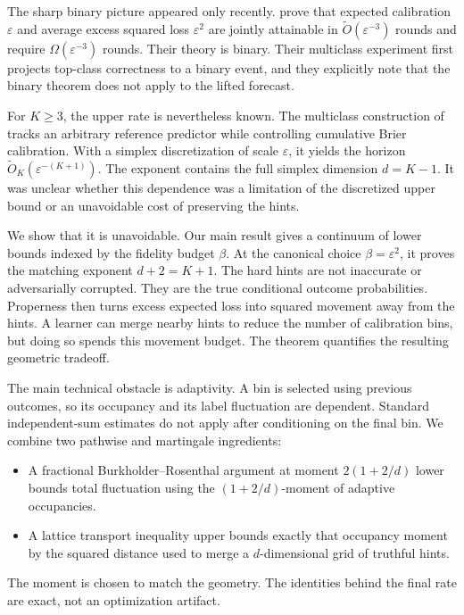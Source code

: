 \documentclass[twoside]{article}
\newcommand{\1}{\mathbf 1}
\begin{document}
The sharp binary picture appeared only recently. \citet{hu2026optimal} prove that expected calibration $\varepsilon$ and average excess squared loss $\varepsilon^2$ are jointly attainable in $\widetilde O(\varepsilon^{-3})$ rounds and require $\Omega(\varepsilon^{-3})$ rounds. Their theory is binary. Their multiclass experiment first projects top-class correctness to a binary event, and they explicitly note that the binary theorem does not apply to the lifted forecast.

For $K\geq3$, the upper rate is nevertheless known. The multiclass construction of \citet{chen2026calibeating} tracks an arbitrary reference predictor while controlling cumulative Brier calibration. With a simplex discretization of scale $\varepsilon$, it yields the horizon $\widetilde O_K(\varepsilon^{-(K+1)})$. The exponent contains the full simplex dimension $d=K-1$. It was unclear whether this dependence was a limitation of the discretized upper bound or an unavoidable cost of preserving the hints.

We show that it is unavoidable. Our main result gives a continuum of lower bounds indexed by the fidelity budget $\beta$. At the canonical choice $\beta=\varepsilon^2$, it proves the matching exponent $d+2=K+1$. The hard hints are not inaccurate or adversarially corrupted. They are the true conditional outcome probabilities. Properness then turns excess expected loss into squared movement away from the hints. A learner can merge nearby hints to reduce the number of calibration bins, but doing so spends this movement budget. The theorem quantifies the resulting geometric tradeoff.

The main technical obstacle is adaptivity. A bin is selected using previous outcomes, so its occupancy and its label fluctuation are dependent. Standard independent-sum estimates do not apply after conditioning on the final bin. We combine two pathwise and martingale ingredients:
\begin{itemize}
\item A fractional Burkholder--Rosenthal argument at moment
$2(1+2/d)$ lower bounds total fluctuation using the $(1+2/d)$-moment of adaptive occupancies.
\item A lattice transport inequality upper bounds exactly that occupancy
moment by the squared distance used to merge a $d$-dimensional grid of truthful hints.
\end{itemize}
The moment is chosen to match the geometry. The identities behind the final rate are exact, not an optimization artifact.
\end{document}
